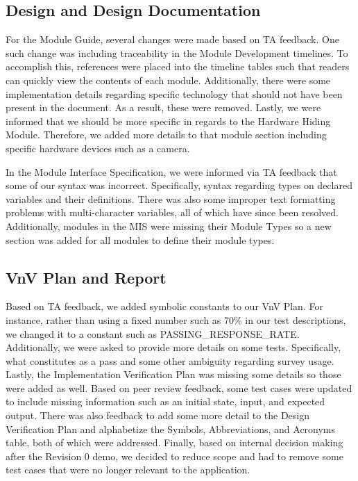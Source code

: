 \documentclass{article}
\begin{document}
\subsection{Design and Design Documentation}

For the Module Guide, several changes were made based on TA feedback. One such change was
including traceability in the Module Development timelines. To accomplish this, references
were placed into the timeline tables such that readers can quickly view the contents of each
module. Additionally, there were some implementation details regarding specific technology that
should not have been present in the document. As a result, these were removed. Lastly, we were
informed that we should be more specific in regards to the Hardware Hiding Module. Therefore,
we added more details to that module section including specific hardware devices such as a camera.

In the Module Interface Specification, we were informed via TA feedback that some of our syntax
was incorrect. Specifically, syntax regarding types on declared variables and their definitions.
There was also some improper text formatting problems with multi-character variables, all of which
have since been resolved. Additionally, modules in the MIS were missing their Module Types so a new
section was added for all modules to define their module types.

\subsection{VnV Plan and Report}

Based on TA feedback, we added symbolic constants to our VnV Plan. For instance, rather than
using a fixed number such as 70\% in our test descriptions, we changed it to a constant such
as PASSING\_RESPONSE\_RATE. Additionally, we were asked to provide more details on some tests. Specifically,
what constitutes as a pass and some other ambiguity regarding survey usage. Lastly, the
Implementation Verification Plan was missing some details so those were added as well. Based on peer review feedback,
some test cases were updated to include missing information such as an initial state, input, and expected output.
There was also feedback to add some more detail to the Design Verification Plan and alphabetize the Symbols,
Abbreviations, and Acronyms table, both of which were addressed. Finally, based on internal decision making
after the Revision 0 demo, we decided to reduce scope and had to remove some test cases that were no longer
relevant to the application.
\end{document}
